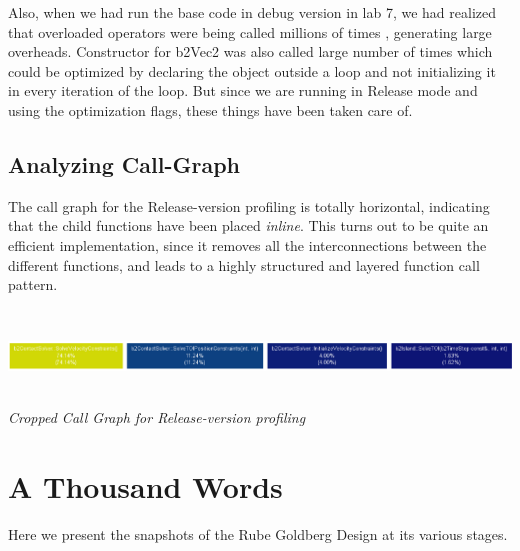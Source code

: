 \documentclass[a4paper,11pt]{article}
\begin{document}
Also, when we had run the base code in debug version in lab 7, we had realized that overloaded operators were being called millions of times , generating large overheads. Constructor for b2Vec2 was also called large number of times which could be optimized by declaring the object outside a loop and not initializing it in every iteration of the loop. But since we are running in Release mode and using the optimization flags, these things have been taken care of. 

\subsection{Analyzing Call-Graph}

The call graph for the Release-version profiling is totally horizontal, indicating that the child functions have been placed \emph{inline}.  This turns out to be quite an efficient implementation, since it removes all the interconnections between the different functions, and leads to a highly structured and layered function call pattern.

\begin{center}
\includegraphics[width=180mm, height=25mm]{call_graph.eps}\\
\emph{Cropped Call Graph for Release-version profiling}
\end{center}


\section{A Thousand Words}

Here we present the snapshots of the Rube Goldberg Design at its various stages.
\end{document}
